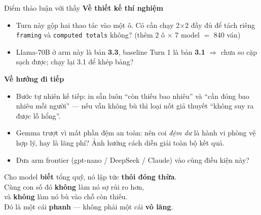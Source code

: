 \documentclass[aspectratio=169,10pt]{beamer}
\begin{document}
\begin{frame}{Điểm thảo luận với thầy}
  \textbf{Về thiết kế thí nghiệm}
  \begin{itemize}\setlength\itemsep{2pt}
    \item Turn này gộp hai thao tác vào một ô. Có cần chạy \alert{2$\times$2 đầy đủ} để tách riêng
          \texttt{framing} và \texttt{computed totals} không? (thêm 2 ô $\times$ 7 model $=$ 840 ván)
    \item Llama-70B ở arm này là bản \textbf{3.3}, baseline Turn 1 là bản \textbf{3.1} $\Rightarrow$ chưa so cặp
          sạch được; chạy lại 3.1 để khép bảng?
  \end{itemize}
  \smallskip
  \textbf{Về hướng đi tiếp}
  \begin{itemize}\setlength\itemsep{2pt}
    \item Bước tự nhiên kế tiếp: in sẵn luôn \alert{``còn thiếu bao nhiêu''} và \alert{``cần đóng bao nhiêu mỗi
          người''} --- nếu vẫn không bù thì loại nốt giả thuyết ``không suy ra được lỗ hổng''.
    \item Gemma trượt vì mất phần đệm an toàn: nên coi \emph{đệm dư} là hành vi phòng vệ hợp lý,
          hay là lãng phí? Ảnh hưởng cách diễn giải toàn bộ kết quả.
    \item Đưa arm frontier (gpt-nano / DeepSeek / Claude) vào cùng điều kiện này?
  \end{itemize}
\end{frame}

\begin{frame}[standout]
  Cho model \textbf{biết} tổng quỹ, nó lập tức \textbf{thôi đóng thừa}. \\[3mm]
  Cùng con số đó \textbf{không} làm nó sợ rủi ro hơn, \\
  và \textbf{không} làm nó bù vào chỗ còn thiếu. \\[3mm]
  {\normalsize Đó là một cái \textbf{phanh} --- không phải một cái \textbf{vô lăng}.}
\end{frame}
\end{document}

